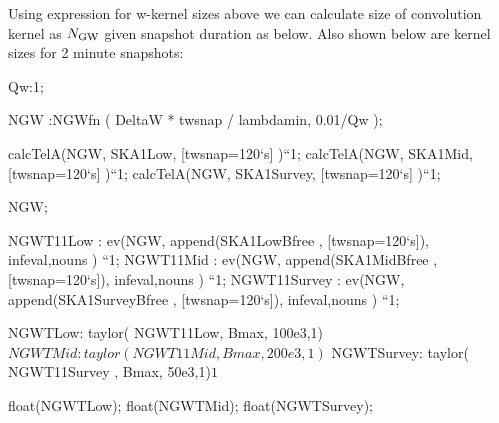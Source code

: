 \documentclass[useAMS,usenatbib,referee]{article}
\begin{document}
Using \cite{Mitchell2014} expression for w-kernel sizes above we can
calculate size of convolution kernel as $N_{\rm GW}$ given snapshot
duration as below. Also shown below are kernel sizes for 2 minute
snapshots:
\begin{maxima}[]
Qw:1;

NGW :NGWfn ( DeltaW * twsnap / lambdamin,  0.01/Qw );

calcTelA(NGW, SKA1Low, [twsnap=120`s] )``1;
calcTelA(NGW, SKA1Mid, [twsnap=120`s] )``1;
calcTelA(NGW, SKA1Survey, [twsnap=120`s] )``1;

NGW;


NGWT11Low :  ev(NGW, append(SKA1LowBfree , [twsnap=120`s]), infeval,nouns ) ``1;
NGWT11Mid :  ev(NGW, append(SKA1MidBfree  , [twsnap=120`s]), infeval,nouns ) ``1;
NGWT11Survey :  ev(NGW, append(SKA1SurveyBfree , [twsnap=120`s]), infeval,nouns ) ``1;

NGWTLow: taylor( NGWT11Low, Bmax, 100e3,1)$
NGWTMid: taylor( NGWT11Mid  , Bmax, 200e3,1)$
NGWTSurvey: taylor( NGWT11Survey  , Bmax, 50e3,1)$
1$

float(NGWTLow);
float(NGWTMid);
float(NGWTSurvey);



\end{maxima}
\end{document}
